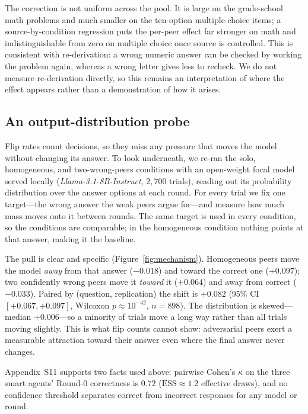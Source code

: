 \documentclass[11pt]{article}
\begin{document}
The correction is not uniform across the pool.
It is large on the grade-school math problems and much smaller on the
ten-option multiple-choice items; a source-by-condition regression puts the
per-peer effect far stronger on math and indistinguishable from zero on
multiple choice once source is controlled.
This is consistent with re-derivation: a wrong numeric answer can be checked by
working the problem again, whereas a wrong letter gives less to recheck.
We do not measure re-derivation directly, so this remains an interpretation of
where the effect appears rather than a demonstration of how it arises.

\subsection{An output-distribution probe}
\label{sub:mechanism}

Flip rates count decisions, so they miss any pressure that moves the model
without changing its answer.
To look underneath, we re-ran the solo, homogeneous, and two-wrong-peers
conditions with an open-weight focal model served locally
(\textit{Llama-3.1-8B-Instruct}, $2{,}700$ trials), reading out its probability
distribution over the answer options at each round.
For every trial we fix one target---the wrong answer the weak peers argue
for---and measure how much mass moves onto it between rounds.
The same target is used in every condition, so the conditions are comparable;
in the homogeneous condition nothing points at that answer, making it the
baseline.

The pull is clear and specific (Figure~\ref{fig:mechanism}).
Homogeneous peers move the model \emph{away} from that answer ($-0.018$) and
toward the correct one ($+0.097$); two confidently wrong peers move it
\emph{toward} it ($+0.064$) and away from correct ($-0.033$).
Paired by (question, replication) the shift is $+0.082$
(95\% CI $[+0.067, +0.097]$, Wilcoxon $p \approx 10^{-42}$, $n = 898$).
The distribution is skewed---median $+0.006$---so a minority of trials move a
long way rather than all trials moving slightly.
This is what flip counts cannot show: adversarial peers exert a measurable
attraction toward their answer even where the final answer never changes.

Appendix~S11 supports two facts used above: pairwise
Cohen's $\kappa$ on the three smart agents' Round-0 correctness is $0.72$
($\mathrm{ESS}\approx 1.2$ effective draws), and no confidence threshold
separates correct from incorrect responses for any model or round.
\end{document}
